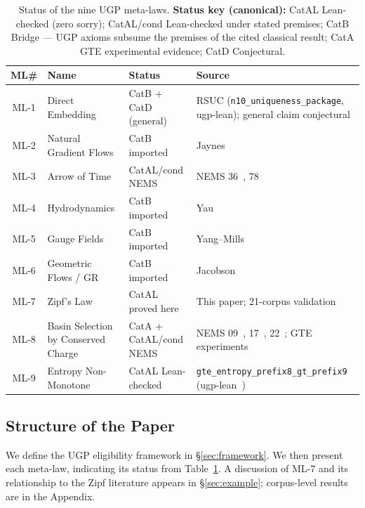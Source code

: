 \documentclass[11pt]{article}
\begin{document}
\begin{table}[h!]
\centering
\caption{Status of the nine UGP meta-laws. \textbf{Status key (canonical):} CatAL Lean-checked (zero sorry); CatAL/cond Lean-checked under stated premises; CatB Bridge — UGP axioms subsume the premises of the cited classical result; CatA GTE experimental evidence; CatD Conjectural.}
\label{tab:ml-status}
\small
\begin{tabular}{@{}cllp{5.5cm}@{}}
\toprule
\textbf{ML\#} & \textbf{Name} & \textbf{Status} & \textbf{Source} \\
\midrule
ML-1 & Direct Embedding         & CatB + CatD (general) & RSUC (\texttt{n10\_uniqueness\_package}, ugp-lean); general claim conjectural \\
ML-2 & Natural Gradient Flows   & CatB imported         & Jaynes~\cite{Jaynes1957} \\
ML-3 & Arrow of Time            & CatAL/cond NEMS        & NEMS 36~\cite{SpivackNEMS36}, 78~\cite{SpivackNEMS78} \\
ML-4 & Hydrodynamics            & CatB imported         & Yau~\cite{Yau1991} \\
ML-5 & Gauge Fields             & CatB imported         & Yang--Mills~\cite{YangMills1954} \\
ML-6 & Geometric Flows / GR     & CatB imported         & Jacobson~\cite{Jacobson1995} \\
ML-7 & Zipf's Law               & CatAL proved here      & This paper; 21-corpus validation \\
ML-8 & Basin Selection by Conserved Charge & CatA + CatAL/cond NEMS  & NEMS 09~\cite{SpivackNEMS09}, 17~\cite{SpivackNEMS17}, 22~\cite{SpivackNEMS22}; GTE experiments \\
ML-9 & Entropy Non-Monotone     & CatAL Lean-checked     & \texttt{gte\_entropy\_prefix8\_gt\_prefix9} (ugp-lean~\cite{ugp-lean}) \\
\bottomrule
\end{tabular}
\end{table}

\subsection{Structure of the Paper}
We define the UGP eligibility framework in \S\ref{sec:framework}. We then present each meta-law, indicating its status from Table~\ref{tab:ml-status}. A discussion of ML-7 and its relationship to the Zipf literature appears in \S\ref{sec:example}; corpus-level results are in the Appendix.
\end{document}
